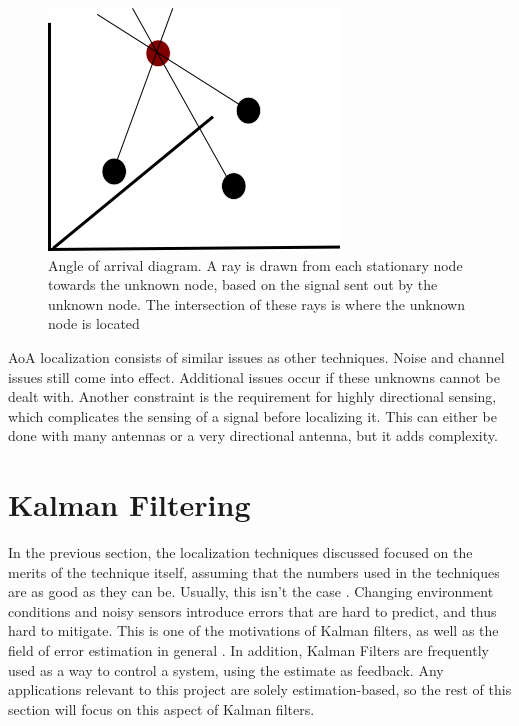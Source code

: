 \begin{figure}[ht]
\centering
\includegraphics[scale=0.5]{img/path4188.png}
\caption{Angle of arrival diagram. A ray is drawn from each stationary node towards the unknown node, based on the signal sent out by the unknown node. The intersection of these rays is where the unknown node is located}
\label{fig:aoa_diagram}
\end{figure}\par
AoA localization consists of similar issues as other techniques. Noise and channel issues still come into effect. Additional issues occur if these unknowns cannot be dealt with. Another constraint is the requirement for highly directional sensing, which complicates the sensing of a signal before localizing it. This can either be done with many antennas or a very directional antenna, but it adds complexity.

\section{Kalman Filtering}
In the previous section, the localization techniques discussed focused on the merits of the technique itself, assuming that the numbers used in the techniques are as good as they can be. Usually, this isn't the case \cite{kf_book}. Changing environment conditions and noisy sensors introduce errors that are hard to predict, and thus hard to mitigate. This is one of the motivations of Kalman filters, as well as the field of error estimation in general \cite{kf_book}. In addition, Kalman Filters are frequently used as a way to control a system, using the estimate as feedback. Any applications relevant to this project are solely estimation-based, so the rest of this section will focus on this aspect of Kalman filters. \par

